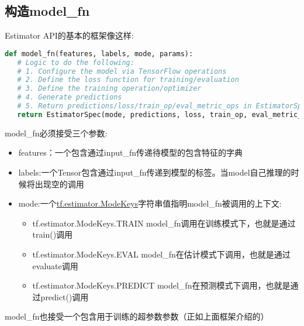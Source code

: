 \subsection{构造model\_fn}
Estimator API的基本的框架像这样:
\begin{lstlisting}[language=Python]
def model_fn(features, labels, mode, params):
   # Logic to do the following:
   # 1. Configure the model via TensorFlow operations
   # 2. Define the loss function for training/evaluation
   # 3. Define the training operation/optimizer
   # 4. Generate predictions
   # 5. Return predictions/loss/train_op/eval_metric_ops in EstimatorSpec object
   return EstimatorSpec(mode, predictions, loss, train_op, eval_metric_ops)
\end{lstlisting}
model\_fn必须接受三个参数:
\begin{itemize}
	\item features：一个包含通过input\_fn传递待模型的包含特征的字典
	\item labels:一个Tensor包含通过input\_fn传递到模型的标签。当model自己推理的时候将出现空的调用
	\item mode:一个\href{https://www.tensorflow.org/api_docs/python/tf/estimator/ModeKeys}{tf.estimator.ModeKeys}字符串值指明model\_fn被调用的上下文:
		\begin{itemize}
	\item tf.estimator.ModeKeys.TRAIN model\_fn调用在训练模式下，也就是通过train()调用
	\item tf.estimator.ModeKeys.EVAL model\_fn在估计模式下调用，也就是通过evaluate调用
	\item tf.estimator.ModeKeys.PREDICT model\_fn在预测模式下调用，也就是通过predict()调用
		\end{itemize}
\end{itemize}
model\_fn也接受一个包含用于训练的超参数参数（正如上面框架介绍的）

